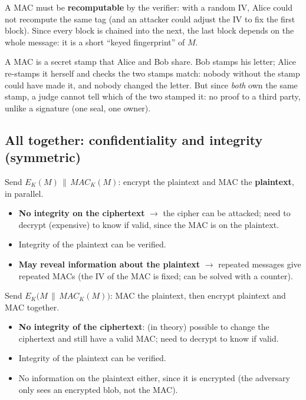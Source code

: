 \begin{rembox}[title=Why a fixed IV and why only the last block?]
A MAC must be \textbf{recomputable} by the verifier: with a random IV, Alice could not
recompute the same tag (and an attacker could adjust the IV to fix the first block).
Since every block is chained into the next, the last block depends on the whole message:
it is a short ``keyed fingerprint'' of $M$.
\end{rembox}

\begin{goatbox}
A MAC is a secret stamp that Alice and Bob share. Bob stamps his letter; Alice re-stamps it
herself and checks the two stamps match: nobody without the stamp could have made it, and nobody
changed the letter. But since \emph{both} own the same stamp, a judge cannot tell which of the two
stamped it: no proof to a third party, unlike a signature (one seal, one owner).
\end{goatbox}

\subsection{All together: confidentiality and integrity (symmetric)}

\begin{defnbox}[title=Encrypt-and-MAC]
Send $E_K(M) \,\|\, MAC_K(M)$: encrypt the plaintext and MAC the \textbf{plaintext},
in parallel.
\begin{itemize}
  \item[$\times$] \textbf{No integrity on the ciphertext} $\to$ the cipher can be
        attacked; need to decrypt (expensive) to know if valid, since the MAC is on the
        plaintext.
  \item[$\checkmark$] Integrity of the plaintext can be verified.
  \item[$\times$] \textbf{May reveal information about the plaintext} $\to$ repeated
        messages give repeated MACs (the IV of the MAC is fixed; can be solved with a
        counter).
\end{itemize}
\end{defnbox}

\begin{defnbox}[title=MAC-then-Encrypt]
Send $E_K\big(M \,\|\, MAC_K(M)\big)$: MAC the plaintext, then encrypt plaintext and MAC
together.
\begin{itemize}
  \item[$\times$] \textbf{No integrity of the ciphertext}: (in theory) possible to change
        the ciphertext and still have a valid MAC; need to decrypt to know if valid.
  \item[$\checkmark$] Integrity of the plaintext can be verified.
  \item[$\checkmark$] No information on the plaintext either, since it is encrypted (the
        adversary only sees an encrypted blob, not the MAC).
\end{itemize}
\end{defnbox}


